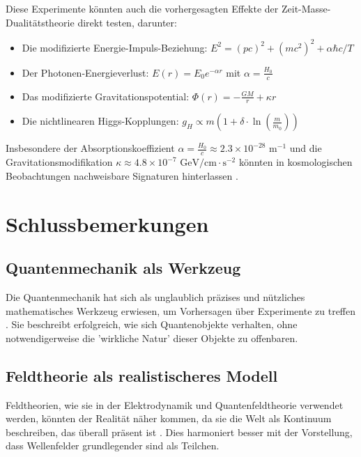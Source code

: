 \documentclass[a4paper,12pt]{article}
\begin{document}
	Diese Experimente könnten auch die vorhergesagten Effekte der Zeit-Masse-Dualitätstheorie direkt testen, darunter:
	\begin{itemize}
		\item Die modifizierte Energie-Impuls-Beziehung: $E^2 = (pc)^2 + (mc^2)^2 + \alpha\hbar c/T$ 
		\item Der Photonen-Energieverlust: $E(r) = E_0e^{-\alpha r}$ mit $\alpha = \frac{H_0}{c}$
		\item Das modifizierte Gravitationspotential: $\Phi(r) = -\frac{GM}{r} + \kappa r$
		\item Die nichtlinearen Higgs-Kopplungen: $g_H \propto m \left(1 + \delta \cdot \ln\left(\frac{m}{m_0}\right)\right)$
	\end{itemize}
	
	Insbesondere der Absorptionskoeffizient $\alpha = \frac{H_0}{c} \approx 2.3 \times 10^{-28} \text{ m}^{-1}$ und die Gravitationsmodifikation $\kappa \approx 4.8 \times 10^{-7} \text{ GeV/cm}\cdot\text{s}^{-2}$ könnten in kosmologischen Beobachtungen nachweisbare Signaturen hinterlassen \cite{Pascher2024}.
	
	\section{Schlussbemerkungen}
	
	\subsection{Quantenmechanik als Werkzeug}
	Die Quantenmechanik hat sich als unglaublich präzises und nützliches mathematisches Werkzeug erwiesen, um Vorhersagen über Experimente zu treffen \cite{Feynman1965}. Sie beschreibt erfolgreich, wie sich Quantenobjekte verhalten, ohne notwendigerweise die 'wirkliche Natur' dieser Objekte zu offenbaren.
	
	\subsection{Feldtheorie als realistischeres Modell}
	Feldtheorien, wie sie in der Elektrodynamik und Quantenfeldtheorie verwendet werden, könnten der Realität näher kommen, da sie die Welt als Kontinuum beschreiben, das überall präsent ist \cite{Wilczek2008}. Dies harmoniert besser mit der Vorstellung, dass Wellenfelder grundlegender sind als Teilchen.
	
\end{document}
